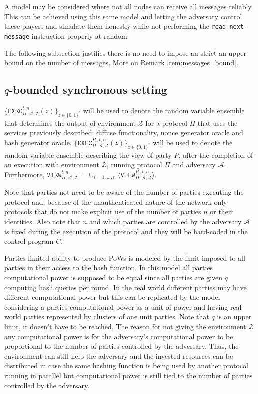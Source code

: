 \documentclass[..]{subfiles}
\begin{document}
A model may be considered where not all nodes can receive all messages reliably. This can be achieved using this same model and letting the adversary control these players and simulate them honestly while not performing the \texttt{read-next-message} instruction properly at random.

The following subsection justifies there is no need to impose an strict an upper bound on the number of messages. More on Remark \ref{rem:messages_bound}.


\subsection{$q$-bounded synchronous setting}

$\{\texttt{EXEC}_{\Pi, \mathcal{A}, \mathcal{Z}}^{t, n}(z)\}_{z \in \{0, 1\}^*}$ will be used to denote the random variable ensemble that determines the output of environment $\mathcal{Z}$ for a protocol $\Pi$ that uses the services previously described: diffuse functionality, nonce generator oracle and hash generator oracle. $\{\texttt{EXEC}_{\Pi, \mathcal{A}, \mathcal{Z}}^{P_i, t, n}(z)\}_{z \in \{0, 1\}^*}$ will be used to denote the random variable ensemble describing the view of party $P_i$ after the completion of an execution with environment $\mathcal{Z}$, running protocol $\Pi$ and adversary $\mathcal{A}$. Furthermore, $\texttt{VIEW}_{\Pi, \mathcal{A}, \mathcal{Z}}^{t, n} = \cup_{i = 1,\dots,n} \langle \texttt{VIEW}_{\Pi, \mathcal{A}, \mathcal{Z}}^{P_i, t, n} \rangle$. 

Note that parties not need to be aware of the number of parties executing the protocol and, because of the unauthenticated nature of the network only protocols that do not make explicit use of the number of parties $n$ or their identities. Also note that $n$ and which parties are controlled by the adversary $\mathcal{A}$ is fixed during the execution of the protocol and they will be hard-coded in the control program $C$\footnotemark.

Parties limited ability to produce PoWs is modeled by the limit imposed to all parties in their access to the hash function. In this model all parties computational power is supposed to be equal since all parties are given $q$ computing hash queries per round. In the real world different parties may have different computational power but this can be replicated by the model considering a parties computational power as a unit of power and having real world parties represented by clusters of one unit parties. Note that $q$ is an upper limit, it doesn't have to be reached. The reason for not giving the environment $\mathcal{Z}$ any computational power is for the adversary's computational power to be proportional to the number of parties controlled by the adversary. Thus, the environment can still help the adversary and the invested resources can be distributed in case the same hashing function is being used by another protocol running in parallel but computational power is still tied to the number of parties controlled by the adversary.
\end{document}
